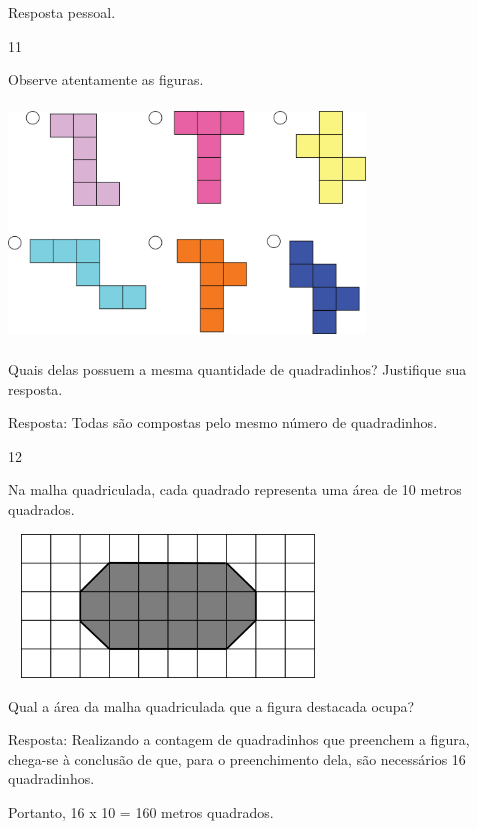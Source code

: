 \begin{escolha}
Resposta pessoal.

\num{11}

Observe atentamente as figuras.


\includegraphics[width=3.72532in,height=2.47521in]{media/image59.png}

Quais delas possuem a mesma quantidade de quadradinhos? Justifique sua resposta.


Resposta:
Todas são compostas pelo mesmo número de quadradinhos.

\num{12}

Na malha quadriculada, cada quadrado representa uma área de 10 metros quadrados.


\includegraphics[width=3.33333in,height=1.50517in]{media/image60.png}

Qual a área da malha quadriculada que a figura destacada ocupa?


Resposta:
Realizando a contagem de quadradinhos que preenchem a figura, chega-se à conclusão de que, para o preenchimento dela, são necessários 16 quadradinhos.

Portanto, 16 x 10 = 160 metros quadrados.



\end{escolha}
